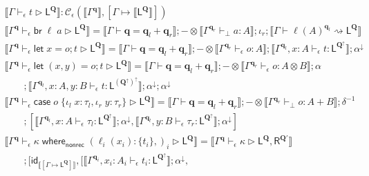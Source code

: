 \documentclass[acmsmall,screen,review]{acmart}
\newcommand{\mc}[1]{\ensuremath{\mathcal{#1}}}
\newcommand{\mb}[1]{\ensuremath{\mathbf{#1}}}
\newcommand{\ms}[1]{\ensuremath{\mathsf{#1}}}
\newcommand{\lto}{:}
\newcommand{\linl}[1]{\iota_l\;{#1}}
\newcommand{\linr}[1]{\iota_r\;{#1}}
\newcommand{\letstmt}[3]{\ensuremath{\ms{let}\;#1 = #2; #3}}
\newcommand{\brb}[2]{\ms{br}\;#1\;#2}
\newcommand{\casestmt}[5]{\ms{case}\;#1\;\{\linl{#2} \lto #3, \linr{#4} \lto #5\}}
\newcommand{\awhere}[2]{#1\;\ms{where}_{\ms{nonrec}}\;#2}
\newcommand{\wbranch}[3]{#1(#2) \lto \{#3\}}
\newcommand{\qsp}[4]{#1 \vdash #2 = #3 + #4}
\newcommand{\lwk}[3]{#1 \vdash #2 \rightsquigarrow #3}
\newcommand{\lhyp}[2]{#1(#2)}
\newcommand{\hasty}[4]{#1 \vdash_{#2} #3: {#4}}
\newcommand{\haslb}[4]{#1 \vdash_{#2} #3 \rhd #4}
\newcommand{\ltoty}[2]{[#1 \mapsto #2]}
\newcommand{\dnt}[1]{\llbracket{#1}\rrbracket}
\newcommand{\zeroqv}[1]{#1^\uparrow}
\begin{document}
\begin{figure}
  \begin{adjustbox}{minipage=1.1\textwidth,scale=0.9}
  \begin{gather*}
    \boxed{\dnt{\haslb{\Gamma}{\epsilon}{t}{\ms{L}^{\mb{Q}}}}
    : \mc{C}_\epsilon(\dnt{\Gamma^{\mb{q}}}, \ltoty{\Gamma}{\dnt{\ms{L}^{\mb{Q}}}})} \\
    \dnt
    {\haslb{\Gamma^{\mb{q}}}{\epsilon}{\brb{\ell}{a}}{\ms{L}^{\mb{Q}}}}
    = \dnt{\qsp{\Gamma}{\mb{q}}{\mb{q}_l}{\mb{q}_r}}
    ; - \otimes \dnt{\hasty{\Gamma^{\mb{q}_r}}{\bot}{a}{A}}
    ; \iota_r
    ; \dnt{\lwk{\Gamma}{\lhyp{\ell}{A}^{\mb{q}_l}}{\ms{L}^{\mb{Q}}}}
    \\
    \dnt
    {\haslb{\Gamma^{\mb{q}}}{\epsilon}{\letstmt{x}{o}{t}}{\ms{L}^{\mb{Q}}}}
    =
    \dnt{\qsp{\Gamma}{\mb{q}}{\mb{q}_l}{\mb{q}_r}}
    ; - \otimes \dnt{\hasty{\Gamma^{\mb{q}_r}}{\epsilon}{o}{A}}
    ; \dnt{\hasty{\Gamma^{\mb{q}_l}, x : A}{\epsilon}{t}{\ms{L}^{\zeroqv{\mb{Q}}}}}
    ; \alpha^\downarrow \\
    \dnt
    {\haslb{\Gamma^{\mb{q}}}{\epsilon}{\letstmt{(x, y)}{o}{t}}{\ms{L}^{\mb{Q}}}}
    =
    \dnt{\qsp{\Gamma}{\mb{q}}{\mb{q}_l}{\mb{q}_r}}
    ; - \otimes \dnt{\hasty{\Gamma^{\mb{q}_r}}{\epsilon}{o}{A \otimes B}}
    ; \alpha
    \\
    \qquad 
    ; \dnt{\hasty{\Gamma^{\mb{q}_l}, x : A, y : B}{\epsilon}{t}
      {\ms{L}^{\zeroqv{(\zeroqv{\mb{Q}})}}}}
    ; \alpha^\downarrow ; \alpha^\downarrow
    \\
    \dnt
    {\haslb{\Gamma^{\mb{q}}}{\epsilon}{\casestmt{o}{x}{\tau_l}{y}{\tau_r}}
      {\ms{L}^{\mb{Q}}}}
    = \dnt{\qsp{\Gamma}{\mb{q}}{\mb{q}_l}{\mb{q}_r}}
    ; - \otimes \dnt{\hasty{\Gamma^{\mb{q}_r}}{\bot}{o}{A + B}}
    ; \delta^{-1}
    \\
    \qquad
    ; [
      \dnt{\hasty{\Gamma^{\mb{q}_l}, x : A}{\epsilon}{\tau_l}{\ms{L}^{\zeroqv{\mb{Q}}}}}
        ; \alpha^\downarrow,
      \dnt{\hasty{\Gamma^{\mb{q}_l}, y : B}{\epsilon}{\tau_r}{\ms{L}^{\zeroqv{\mb{Q}}}}}
        ; \alpha^\downarrow
    ]
    \\
    \dnt
    {\haslb{\Gamma^{\mb{q}}}{\epsilon}{\awhere{\kappa}{(\wbranch{\ell_i}{x_i}{t_i},)_i}}
      {\ms{L}^{\mb{Q}}}}
    =
    \dnt{\haslb{\Gamma^{\mb{q}}}{\epsilon}{\kappa}
      {\ms{L}^{\mb{Q}}, \ms{R}^{\mb{Q}'}}}
    \\ 
    \qquad ; [
      \ms{id}_{\dnt{\ltoty{\Gamma}{\ms{L}^{\mb{Q}}}}},
      [
        \dnt{\hasty{\Gamma^{\mb{q}_i}, x_i : A_i}{\epsilon}{t_i}
          {\ms{L}^{\zeroqv{\mb{Q}}}}} ; \alpha^\downarrow,

\end{gather*}
\end{adjustbox}
\end{figure}
\end{document}
